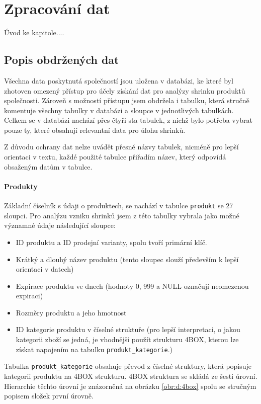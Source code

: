 \chapter{Zpracování dat}

Úvod ke kapitole.... %

\section{Popis obdržených dat}

Všechna data poskytnutá společností jsou uložena v databázi, ke které byl zhotoven omezený přístup pro účely získání dat pro analýzy shrinku produktů společnosti. Zároveň s možností přístupu jsem obdržela i tabulku, která stručně komentuje všechny tabulky v databázi a sloupce v jednotlivých tabulkách. Celkem se v databázi nachází přes čtyři sta tabulek, z nichž bylo potřeba vybrat pouze ty, které obsahují relevantní data pro úlohu shrinků.

Z důvodu ochrany dat nelze uvádět přesné názvy tabulek, nicméně pro lepší orientaci v textu, každé použité tabulce přiřadím název, který odpovídá obsaženým datům v tabulce.

\subsubsection{Produkty}

Základní číselník s údaji o produktech, se nachází v tabulce \texttt{produkt} se 27 sloupci. Pro analýzu vzniku shrinků jsem z této tabulky vybrala jako možné významné údaje následující sloupce:
\begin{itemize}
    \item ID produktu a ID prodejní varianty, spolu tvoří primární klíč. 
    \item Krátký a dlouhý název produktu (tento sloupec slouží především k lepší orientaci v datech)
    \item Expirace produktu ve dnech (hodnoty 0, 999 a NULL označují neomezenou expiraci)
    \item Rozměry produktu a jeho hmotnost
    \item ID kategorie produktu v číselné struktuře (pro lepší interpretaci, o jakou kategorii zboží se jedná, je vhodnější použít strukturu 4BOX, kterou lze získat napojením na tabulku \texttt{produkt\_kategorie}.)
\end{itemize}
Tabulka \texttt{produkt\_kategorie} obsahuje převod z číselné struktury, která popisuje kategorii produktu na 4BOX strukturu. 4BOX struktura se skládá ze šesti úrovní. Hierarchie těchto úrovní je znázorněná na obrázku \ref*{obr:d:4box} spolu se stručným popisem složek první úrovně.

